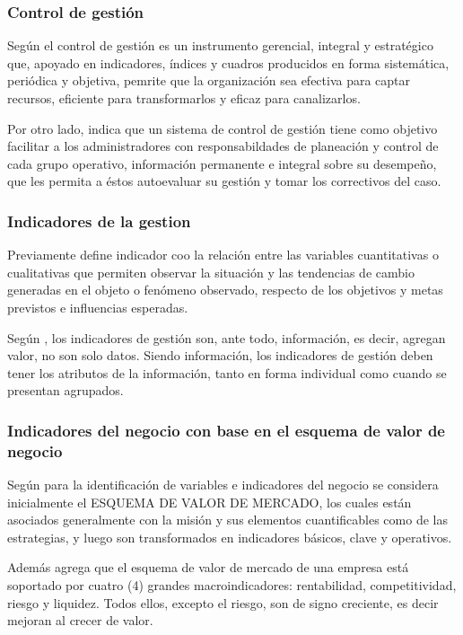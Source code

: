 \subsubsection{Control de gesti\'on}
Seg\'un \cite{beltran} el control de gesti\'on es un instrumento gerencial, integral
y estrat\'egico que, apoyado en indicadores, \'indices y cuadros producidos en forma
sistem\'atica, peri\'odica y objetiva, pemrite que la organizaci\'on sea efectiva para
captar recursos, eficiente para transformarlos y eficaz para canalizarlos.

Por otro lado, \cite{beltran} indica que un sistema de control de gesti\'on tiene
como objetivo facilitar a los administradores con responsabildades de planeaci\'on
y control de cada grupo operativo, informaci\'on permanente e integral sobre su desempe\~no,
que les permita a \'estos autoevaluar su gesti\'on y tomar los correctivos del caso.

\subsubsection{Indicadores de la gestion}
Previamente \cite{beltran} define indicador coo la relaci\'on entre las variables
cuantitativas o cualitativas que permiten observar la situaci\'on y las tendencias
de cambio generadas en el objeto o fen\'omeno observado, respecto de los objetivos
y metas previstos e influencias esperadas.

Seg\'un \cite{beltran}, los indicadores de gesti\'on son, ante todo, informaci\'on, es
decir, agregan valor, no son solo datos. Siendo informaci\'on, los indicadores de
gesti\'on deben tener los atributos de la informaci\'on, tanto en forma individual
como cuando se presentan agrupados.

\subsubsection{Indicadores del negocio con base en el esquema de valor de negocio}
Seg\'un \cite{cruz} para la identificaci\'on de variables e indicadores del negocio
se considera inicialmente el ESQUEMA DE VALOR DE MERCADO, los cuales est\'an asociados
generalmente con la misi\'on y sus elementos cuantificables como de las estrategias,
y luego son transformados en indicadores b\'asicos, clave y operativos.

Adem\'as \cite{cruz} agrega que el esquema de valor de mercado de una empresa est\'a
soportado por cuatro (4) grandes macroindicadores: rentabilidad, competitividad,
riesgo y liquidez. Todos ellos, excepto el riesgo, son de signo creciente, es
decir mejoran al crecer de valor.

